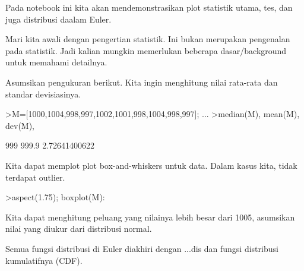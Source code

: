 \documentclass{article}
\begin{document}
\begin{eulernotebook}
\begin{eulercomment}
Pada notebook ini kita akan mendemonstrasikan plot statistik utama,
tes, dan juga distribusi daalam Euler.

Mari kita awali dengan pengertian statistik. Ini bukan merupakan
pengenalan pada statistik. Jadi kalian mungkin memerlukan beberapa
dasar/background untuk memahami detailnya.

Asumsikan pengukuran berikut. Kita ingin menghitung nilai rata-rata
dan standar devisiasinya.
\end{eulercomment}
\begin{eulerprompt}
>M=[1000,1004,998,997,1002,1001,998,1004,998,997]; ...
>median(M), mean(M), dev(M),
\end{eulerprompt}
\begin{euleroutput}
  999
  999.9
  2.72641400622
\end{euleroutput}
\begin{eulercomment}
Kita dapat memplot plot box-and-whiskers untuk data. Dalam kasus kita,
tidak terdapat outlier.
\end{eulercomment}
\begin{eulerprompt}
>aspect(1.75); boxplot(M):
\end{eulerprompt}
\begin{eulercomment}
Kita dapat menghitung peluang yang nilainya lebih besar dari 1005,
asumsikan nilai yang diukur dari distribusi normal.

Semua fungsi distribusi di Euler diakhiri dengan ...dis dan fungsi
distribusi kumulatifnya (CDF).


\end{eulercomment}
\end{eulernotebook}
\end{document}
